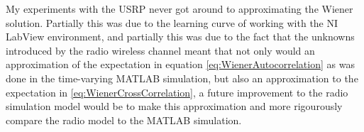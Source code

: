 My experiments with the USRP never got around to approximating %
the Wiener solution. Partially this was due to the learning curve of %
working with the NI LabView environment, and partially this was %
due to the fact that the unknowns introduced by the %
radio wireless channel meant that not only would an approximation %
of the expectation in equation \ref{eq:WienerAutocorrelation} as %
was done in the time-varying MATLAB simulation, but also an approximation to the %
expectation in \ref{eq:WienerCrossCorrelation}, a future improvement %
to the radio simulation model would be to make this approximation and %
more rigourously compare the radio model to the MATLAB simulation.
